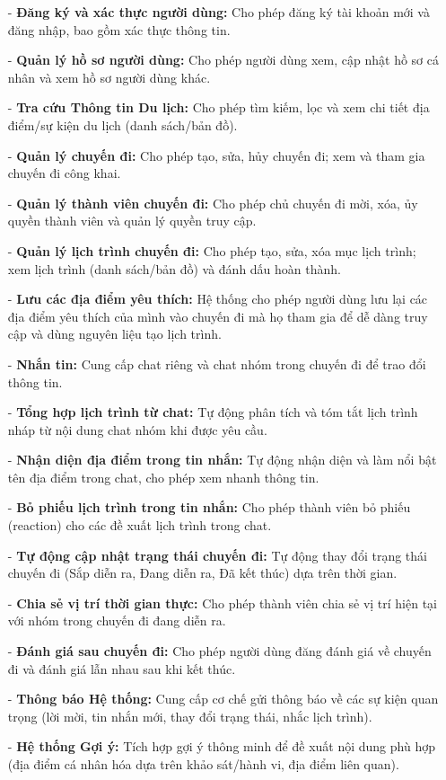 \begin{itemize}
    \item[-] \textbf{Đăng ký và xác thực người dùng:} Cho phép đăng ký tài khoản mới và đăng nhập, bao gồm xác thực thông tin.
    \item[-] \textbf{Quản lý hồ sơ người dùng:} Cho phép người dùng xem, cập nhật hồ sơ cá nhân và xem hồ sơ người dùng khác.
    \item[-] \textbf{Tra cứu Thông tin Du lịch:} Cho phép tìm kiếm, lọc và xem chi tiết địa điểm/sự kiện du lịch (danh sách/bản đồ).
    \item[-] \textbf{Quản lý chuyến đi:} Cho phép tạo, sửa, hủy chuyến đi; xem và tham gia chuyến đi công khai.
    \item[-] \textbf{Quản lý thành viên chuyến đi:} Cho phép chủ chuyến đi mời, xóa, ủy quyền thành viên và quản lý quyền truy cập.
    \item[-] \textbf{Quản lý lịch trình chuyến đi:} Cho phép tạo, sửa, xóa mục lịch trình; xem lịch trình (danh sách/bản đồ) và đánh dấu hoàn thành.
    \item[-] \textbf{Lưu các địa điểm yêu thích:} Hệ thống cho phép người dùng lưu lại các địa điểm yêu thích của mình vào chuyến đi mà họ tham gia để dễ dàng truy cập và dùng nguyên liệu tạo lịch trình.
    \item[-] \textbf{Nhắn tin:} Cung cấp chat riêng và chat nhóm trong chuyến đi để trao đổi thông tin.
    \item[-] \textbf{Tổng hợp lịch trình từ chat:} Tự động phân tích và tóm tắt lịch trình nháp từ nội dung chat nhóm khi được yêu cầu.
    \item[-] \textbf{Nhận diện địa điểm trong tin nhắn:} Tự động nhận diện và làm nổi bật tên địa điểm trong chat, cho phép xem nhanh thông tin.
    \item[-] \textbf{Bỏ phiếu lịch trình trong tin nhắn:} Cho phép thành viên bỏ phiếu (reaction) cho các đề xuất lịch trình trong chat.
    \item[-] \textbf{Tự động cập nhật trạng thái chuyến đi:} Tự động thay đổi trạng thái chuyến đi (Sắp diễn ra, Đang diễn ra, Đã kết thúc) dựa trên thời gian.
    \item[-] \textbf{Chia sẻ vị trí thời gian thực:} Cho phép thành viên chia sẻ vị trí hiện tại với nhóm trong chuyến đi đang diễn ra.
    \item[-] \textbf{Đánh giá sau chuyến đi:} Cho phép người dùng đăng đánh giá về chuyến đi và đánh giá lẫn nhau sau khi kết thúc.
    \item[-] \textbf{Thông báo Hệ thống:} Cung cấp cơ chế gửi thông báo về các sự kiện quan trọng (lời mời, tin nhắn mới, thay đổi trạng thái, nhắc lịch trình).
\item[-] \textbf{Hệ thống Gợi ý:} Tích hợp gợi ý thông minh để đề xuất nội dung phù hợp (địa điểm cá nhân hóa dựa trên khảo sát/hành vi, địa điểm liên quan).
\end{itemize}

